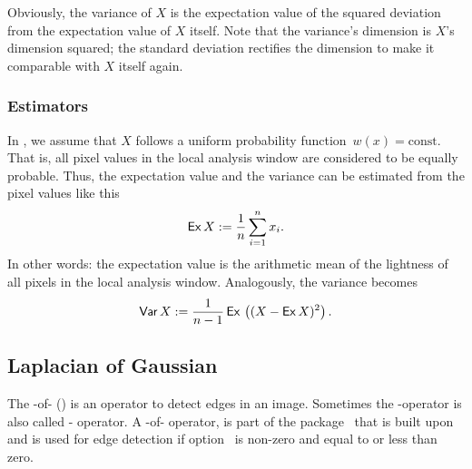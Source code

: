 Obviously, the variance of $X$ is the expectation value of the squared
deviation from the expectation value of $X$ itself.  Note that the
variance's dimension is $X$'s dimension squared; the standard
deviation rectifies the dimension to make it comparable with $X$
itself again.


\subsubsection[Estimators]{Estimators
  \label{sec:estimators}
  }

In \App{}, we assume that $X$ follows a uniform probability
function~$w(x) = \mbox{const.}$  That is, all pixel values in the
local analysis window are considered to be equally probable.  Thus,
the expectation value and the variance can be estimated from the pixel
values like this
\[
    \mbox{\textsf{Ex}\,} X := \frac{1}{n} \sum_{i = 1}^n x_i.
\]
\noindent In other words: the expectation value is the arithmetic mean
of the lightness of all pixels in the local analysis window.
Analogously, the variance becomes
\[
    \mbox{\textsf{Var}\,} X :=
    \frac{1}{n - 1} \, \mbox{\textsf{Ex}\,}\left( (X - \mbox{\textsf{Ex}\,} X)^2 \right).
\]


\subsection[Laplacian of Gaussian]{Laplacian of Gaussian
  \label{sec:laplacian-of-gaussian}
  }

\begin{sloppypar}
  The -of-%
  ()
  is an operator to detect edges in an image.  Sometimes the
  -operator is also called
  - operator.  A
  -of- operator,
  is part of the package~ that
  \App{} is built upon and is used for edge detection if
  option~ is non-zero and
   equal to or less than zero.
\end{sloppypar}

